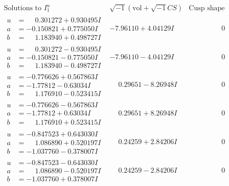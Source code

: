 \documentclass[1p]{elsarticle_modified}
\theoremstyle{definition}
\newcommand{\I}{\sqrt{-1}}
\begin{document}
$$\begin{array}{c|c|c}  
\text{Solutions to }I^u_{1}& \I (\text{vol} + \sqrt{-1}CS) & \text{Cusp shape}\\
 \hline 
\begin{aligned}
u &= \phantom{-}0.301272 + 0.930495 I \\
a &= -0.150821 + 0.775050 I \\
b &= \phantom{-}1.183940 + 0.498727 I\end{aligned}
 & -7.96110 + 4.04129 I & \phantom{-0.000000 } 0 \\ \hline\begin{aligned}
u &= \phantom{-}0.301272 - 0.930495 I \\
a &= -0.150821 - 0.775050 I \\
b &= \phantom{-}1.183940 - 0.498727 I\end{aligned}
 & -7.96110 - 4.04129 I & \phantom{-0.000000 } 0 \\ \hline\begin{aligned}
u &= -0.776626 + 0.567863 I \\
a &= -1.77812 - 0.63034 I \\
b &= \phantom{-}1.176910 - 0.523415 I\end{aligned}
 & \phantom{-}0.29651 - 8.26948 I & \phantom{-0.000000 } 0 \\ \hline\begin{aligned}
u &= -0.776626 - 0.567863 I \\
a &= -1.77812 + 0.63034 I \\
b &= \phantom{-}1.176910 + 0.523415 I\end{aligned}
 & \phantom{-}0.29651 + 8.26948 I & \phantom{-0.000000 } 0 \\ \hline\begin{aligned}
u &= -0.847523 + 0.643030 I \\
a &= \phantom{-}1.086890 + 0.520197 I \\
b &= -1.037760 - 0.378007 I\end{aligned}
 & \phantom{-}0.24259 + 2.84206 I & \phantom{-0.000000 } 0 \\ \hline\begin{aligned}
u &= -0.847523 - 0.643030 I \\
a &= \phantom{-}1.086890 - 0.520197 I \\
b &= -1.037760 + 0.378007 I\end{aligned}
 & \phantom{-}0.24259 - 2.84206 I & \phantom{-0.000000 } 0 \\ \hline\begin{aligned}

\end{aligned}
\end{array}$$
\end{document}
